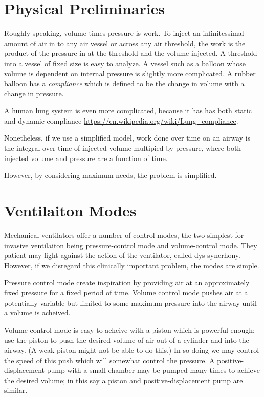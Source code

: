 \documentclass{article}
\begin{document}
\section{Physical Preliminaries}

Roughly speaking, volume times pressure is work.
To inject an infinitessimal amount of air in
to any air vessel or across any air threshold,
the work is the product of the pressure in at the threshold and the
volume injected.
A threshold into a vessel of fixed size is easy to analyze.
A vessel such as a balloon whose volume is dependent on internal pressure
is slightly more complicated.
A rubber balloon has a {\em compliance} which is defined to be
the change in volume with a change in pressure.

A human lung system is even more
complicated, because it has has
both static and dynamic compliance \url{https://en.wikipedia.org/wiki/Lung_compliance}.

Nonetheless, if we use a simplified model, work done over time
on an airway is the integral over time of injected volume
multipied by pressure, where both injected volume and
pressure are a function of time.

However, by considering maximum needs, the problem is simplified.

\section{Ventilaiton Modes}

Mechanical ventilators offer a number of control modes, the two
simplest for invasive ventilaiton
being pressure-control mode and volume-control mode.
They patient may fight against the action of the ventilator,
called dys-syncrhony. However, if we disregard this clinically
important problem, the modes are simple.

Pressure control mode create inspiration by providing air
at an approximately fixed pressure for a fixed period of time.
Volume control mode pushes air at a potentially variable but
limited to some maximum pressure into the airway until a volume
is acheived.

Volume control mode is easy to acheive with a piston which is
powerful enough: use the piston to push the desired volume of
air out of a cylinder and into the airway. (A weak piston might
not be able to do this.) In so doing we may control the speed
of this push which will somewhat control the pressure.
A positive-displacement pump with a small chamber may be pumped
many times to achieve the desired volume; in this say a
piston and positive-displacement pump are similar.
\end{document}
